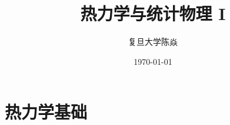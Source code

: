 \documentclass[a4paper]{book}
\title{\vspace{-4 cm}\bfseries 热力学与统计物理 I}
\author{\kaishu 复旦大学\quad 陈焱}
\date{\kaishu\today}
\numberwithin{equation}{section}
\begin{document}
\maketitle
%
%
%
%
%
\chapter{热力学基础}

%
%
%
%
%
%
%
%
\end{document}

